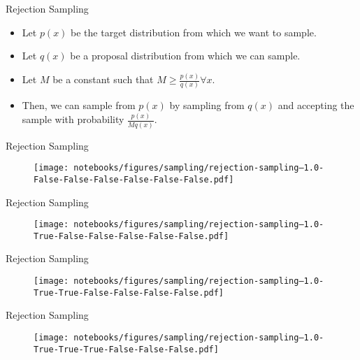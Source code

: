 \documentclass[handout]{beamer}
\begin{document}
    \begin{frame}{Rejection Sampling}
        \begin{itemize}
            \item Let $p(x)$ be the target distribution from which we want to sample.
            \item Let $q(x)$ be a proposal distribution from which we can sample.
            \item Let $M$ be a constant such that $M \geq \frac{p(x)}{q(x)} \forall x$.
            \item Then, we can sample from $p(x)$ by sampling from $q(x)$ and accepting the sample with probability $\frac{p(x)}{M q(x)}$.
        \end{itemize}
        
    \end{frame}

    \begin{frame}{Rejection Sampling}
        \begin{figure}
            \centering
            \texttt{[image: notebooks/figures/sampling/rejection-sampling--1.0-False-False-False-False-False-False.pdf]}
        \end{figure}
        
    \end{frame}

    \begin{frame}{Rejection Sampling}
        \begin{figure}
            \centering
            \texttt{[image: notebooks/figures/sampling/rejection-sampling--1.0-True-False-False-False-False-False.pdf]}
        \end{figure}
        
    \end{frame}

    \begin{frame}{Rejection Sampling}
        \begin{figure}
            \centering
            \texttt{[image: notebooks/figures/sampling/rejection-sampling--1.0-True-True-False-False-False-False.pdf]}
        \end{figure}
    \end{frame}
        
    \begin{frame}{Rejection Sampling}
        \begin{figure}
            \centering
            \texttt{[image: notebooks/figures/sampling/rejection-sampling--1.0-True-True-True-False-False-False.pdf]}
        \end{figure}
    \end{frame}
        
    
    
\end{document}
